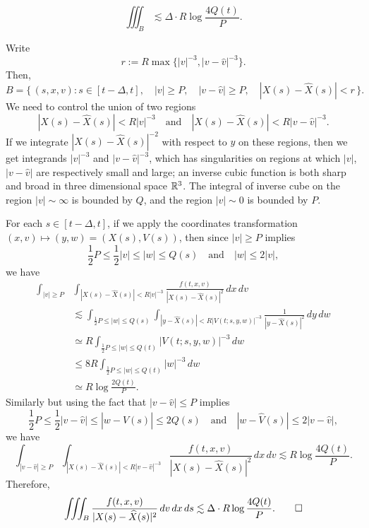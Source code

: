 \documentclass[12pt]{article}
\begin{document}
\begin{prop}
\[\iiint_B\lesssim\Delta\cdot R\log\frac{4Q(t)}P.\]
\end{prop}
\begin{pf}
Write
\[r:=R\max\{|v|^{-3},|v-\hat v|^{-3}\}.\]
Then,
\[B=\{\,(s,x,v):s\in[t-\Delta,t],\quad|v|\ge P,\quad|v-\hat v|\ge P,\quad |X(s)-\hat X(s)|<r\,\}.\]
We need to control the union of two regions
\[|X(s)-\hat X(s)|<R|v|^{-3}\quad\text{and}\quad|X(s)-\hat X(s)|<R|v-\hat v|^{-3}.\]
If we integrate $|X(s)-\hat X(s)|^{-2}$ with respect to $y$ on these regions, then we get integrands $|v|^{-3}$ and $|v-\hat v|^{-3}$, which has singularities on regions at which $|v|$, $|v-\hat v|$ are respectively small and large; an inverse cubic function is both sharp and broad in three dimensional space $\R^3$.
The integral of inverse cube on the region $|v|\sim\infty$ is bounded by $Q$, and the region $|v|\sim0$ is bounded by $P$.

For each $s\in[t-\Delta,t]$, if we apply the coordinates transformation $(x,v)\mapsto(y,w)=(X(s),V(s))$, then since $|v|\ge P$ implies
\[\frac12P\le\frac12|v|\le|w|\le Q(s)\quad\text{and}\quad|w|\le2|v|,\]
we have
\begin{align*}
\int_{|v|\ge P}&\int_{|X(s)-\hat X(s)|<R|v|^{-3}}\frac{f(t,x,v)}{|X(s)-\hat X(s)|^2}\,dx\,dv\\
&\lesssim\int_{\frac12P\le|w|\le Q(s)}\int_{|y-\hat X(s)|<R|V(t;s,y,w)|^{-3}}\frac1{|y-\hat X(s)|^2}\,dy\,dw\\
&\simeq R\int_{\frac12P\le|w|\le Q(t)}|V(t;s,y,w)|^{-3}\,dw\\
&\le8R\int_{\frac12P\le|w|\le Q(t)}|w|^{-3}\,dw\\
&\simeq R\log\frac{2Q(t)}P.
\end{align*}
Similarly but using the fact that $|v-\hat v|\le P$ implies
\[\frac12P\le\frac12|v-\hat v|\le|w-\hat V(s)|\le 2Q(s)\quad\text{and}\quad|w-\hat V(s)|\le2|v-\hat v|,\]
we have
\[\int_{|v-\hat v|\ge P}\int_{|X(s)-\hat X(s)|<R|v-\hat v|^{-3}}\frac{f(t,x,v)}{|X(s)-\hat X(s)|^2}\,dx\,dv\lesssim R\log\frac{4Q(t)}P.\]
Therefore,
\[\iiint_B\frac{f(t,x,v)}{|X(s)-\hat X(s)|^2}\,dv\,dx\,ds\lesssim\Delta\cdot R\log\frac{4Q(t)}P.\qedhere\]
\end{pf}
\end{document}
